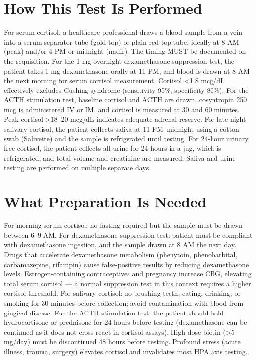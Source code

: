 \section*{How This Test Is Performed}
For serum cortisol, a healthcare professional draws a blood sample from a vein into a serum separator tube (gold-top) or plain red-top tube, ideally at 8 AM (peak) and/or 4 PM or midnight (nadir). The timing MUST be documented on the requisition. For the 1 mg overnight dexamethasone suppression test, the patient takes 1 mg dexamethasone orally at 11 PM, and blood is drawn at 8 AM the next morning for serum cortisol measurement. Cortisol <1.8 mcg/dL effectively excludes Cushing syndrome (sensitivity 95\%, specificity 80\%). For the ACTH stimulation test, baseline cortisol and ACTH are drawn, cosyntropin 250 mcg is administered IV or IM, and cortisol is measured at 30 and 60 minutes. Peak cortisol >18--20 mcg/dL indicates adequate adrenal reserve. For late-night salivary cortisol, the patient collects saliva at 11 PM--midnight using a cotton swab (Salivette) and the sample is refrigerated until testing. For 24-hour urinary free cortisol, the patient collects all urine for 24 hours in a jug, which is refrigerated, and total volume and creatinine are measured. Saliva and urine testing are performed on multiple separate days.

\section*{What Preparation Is Needed}
For morning serum cortisol: no fasting required but the sample must be drawn between 6--9 AM. For dexamethasone suppression test: patient must be compliant with dexamethasone ingestion, and the sample drawn at 8 AM the next day. Drugs that accelerate dexamethasone metabolism (phenytoin, phenobarbital, carbamazepine, rifampin) cause false-positive results by reducing dexamethasone levels. Estrogen-containing contraceptives and pregnancy increase CBG, elevating total serum cortisol --- a normal suppression test in this context requires a higher cortisol threshold. For salivary cortisol: no brushing teeth, eating, drinking, or smoking for 30 minutes before collection; avoid contamination with blood from gingival disease. For the ACTH stimulation test: the patient should hold hydrocortisone or prednisone for 24 hours before testing (dexamethasone can be continued as it does not cross-react in cortisol assays). High-dose biotin (>5 mg/day) must be discontinued 48 hours before testing. Profound stress (acute illness, trauma, surgery) elevates cortisol and invalidates most HPA axis testing.

